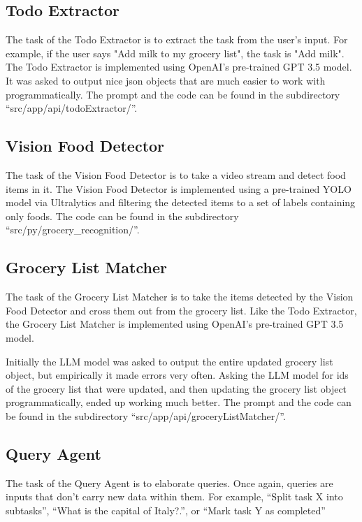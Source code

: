\documentclass{article}
\begin{document}
\subsection*{\color{draculayellow}Todo Extractor}

The task of the Todo Extractor is to extract the task from the user's input. For example, if the user says "Add milk to my grocery list", the task is "Add milk". The Todo Extractor is implemented using OpenAI's pre-trained GPT 3.5 model. It was asked to output nice json objects that are much easier to work with programmatically. The prompt and the code can be found in the subdirectory ``src/app/api/todoExtractor/''.


\subsection*{\color{draculayellow}Vision Food Detector}

The task of the Vision Food Detector is to take a video stream and detect food items in it. The Vision Food Detector is implemented using a pre-trained YOLO model via Ultralytics and filtering the detected items to a set of labels containing only foods. The code can be found in the subdirectory ``src/py/grocery\_recognition/''.

\subsection*{\color{draculayellow}Grocery List Matcher}

The task of the Grocery List Matcher is to take the items detected by the Vision Food Detector and cross them out from the grocery list. Like the Todo Extractor, the Grocery List Matcher is implemented using OpenAI's pre-trained GPT 3.5 model.


Initially the LLM model was asked to output the entire updated grocery list object, but empirically it made errors very often.
Asking the LLM model for ids of the grocery list that were updated, and then updating the grocery list object programmatically, ended up working much better. The prompt and the code can be found in the subdirectory ``src/app/api/groceryListMatcher/''.

\subsection*{\color{draculayellow}Query Agent}

The task of the Query Agent is to elaborate queries. Once again, queries are inputs that don't carry new data within them. For example, ``Split task X into subtasks'', ``What is the capital of Italy?.'', or ``Mark task Y as completed''
\end{document}

